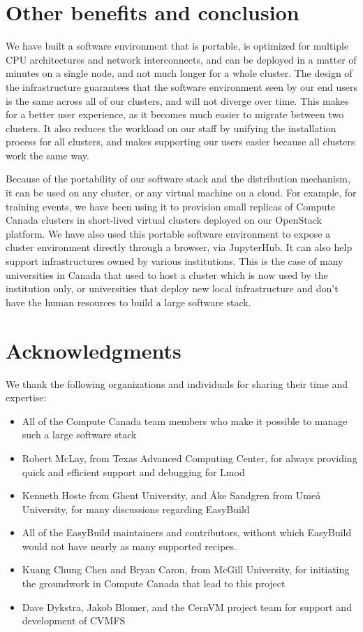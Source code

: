 \documentclass[sigconf]{acmart}
\begin{document}
\section{Other benefits and conclusion}
\label{sec:Conclusion}
We have built a software environment that is portable, is optimized for multiple CPU architectures and network interconnects, and can be deployed in a matter of minutes on a single node, and not much longer for a whole cluster. The design of the infrastructure guarantees that the software environment seen by our end users is the same across all of our clusters, and will not diverge over time. This makes for a better user experience, as it becomes much easier to migrate between two clusters. It also reduces the workload on our staff by unifying the installation process for all clusters, and makes supporting our users easier because all clusters work the same way.

Because of the portability of our software stack and the distribution mechanism, it can be used on any cluster, or any virtual machine on a cloud. For example, for training events, we have been using it to provision small replicas of Compute Canada clusters in short-lived virtual clusters deployed on our OpenStack platform. We have also used this portable software environment to expose a cluster environment directly through a browser, via JupyterHub. It can also help support infrastructures owned by various institutions. This is the case of many universities in Canada that used to host a cluster which is now used by the institution only, or universities that deploy new local infrastructure and don't have the human resources to build a large software stack.


\section{Acknowledgments}
\label{sec:Acknowledgments}
We thank the following organizations and individuals for sharing their time and expertise:
\begin{itemize}
	\item All of the Compute Canada team members who make it possible to manage such a large software stack
	\item Robert McLay, from Texas Advanced Computing Center, for always providing quick and efficient support and
debugging for Lmod
	\item Kenneth Hoste from Ghent University, and Åke Sandgren from Umeå University, for many discussions
regarding EasyBuild
    \item All of the EasyBuild maintainers and contributors, without which EasyBuild would not have nearly as many supported recipes.
	\item Kuang Chung Chen and Bryan Caron, from McGill University, for initiating the groundwork in Compute Canada that lead to this project
	\item Dave Dykstra, Jakob Blomer, and the CernVM project team for support and development of CVMFS
\end{itemize}



\end{document}
